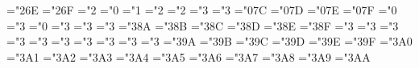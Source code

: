 { \def\bmlgroup{\delimiter"4\mtbmi@@2E\mtbex@@3A }%
 \def\bmrgroup{\delimiter"5\mtbmi@@2F\mtbex@@3B }%
 \def\bmbracevert{\delimiter"\mtbex@@8D\mtbex@@8D }%
 \mathchardef\bmsetminus="2\mtbsy@@6E 
 \mathchardef\bmwr="2\mtbsy@@6F
 \def\bmsurd{{\mathchar"1\mtbsy@@70}}%
 \mathchardef\bmamalg="2
 \mathchardef\bmnabla="0
 \mathchardef\bmsmallint="1
 \mathchardef\bmsqcup="2
 \mathchardef\bmsqcap="2
 \mathchardef\bmsqsubseteq="3
 \mathchardef\bmsqsupseteq="3
 \mathchardef\bmclubsuit="0\mtbsy@@7C
 \mathchardef\bmdiamondsuit="0\mtbsy@@7D
 \mathchardef\bmheartsuit="0\mtbsy@@7E
 \mathchardef\bmspadesuit="0\mtbsy@@7F
 \mathchardef\bmhbar="0
 \mathchardef\bmnotin="3
 \mathchardef\bmangle="0
 \mathchardef\bmdoteq="3
 \mathchardef\bmmodels="3
 \mathchardef\bmbowtie="3
 \mathchardef\bmcong="3\mtbsy@@8A
 \mathchardef\bmhookleftarrow="3\mtbsy@@8B
 \mathchardef\bmhookrightarrow="3\mtbsy@@8C
 \mathchardef\bmlongleftarrow="3\mtbsy@@8D
 \mathchardef\bmlongrightarrow="3\mtbsy@@8E
 \mathchardef\bmLongleftarrow="3\mtbsy@@8F
 \mathchardef\bmLongrightarrow="3
 \mathchardef\bmmapsto="3
 \mathchardef\bmlongmapsto="3
 \mathchardef\bmlongleftrightarrow="3
 \mathchardef\bmLongleftrightarrow="3
 \def\bmiff{\;\bmLongleftrightarrow\;}%
 \mathchardef\bmrightleftharpoons="3
 \mathchardef\bmnotless="3
 \mathchardef\bmnotleq="3
 \mathchardef\bmnotprec="3
 \mathchardef\bmnotpreceq="3
 \mathchardef\bmnotsubset="3\mtbsy@@9A
 \mathchardef\bmnotsubseteq="3\mtbsy@@9B
 \mathchardef\bmnotsqsubseteq="3\mtbsy@@9C
 \mathchardef\bmnotgr="3\mtbsy@@9D
 \mathchardef\bmnotgeq="3\mtbsy@@9E
 \mathchardef\bmnotsucc="3\mtbsy@@9F
 \mathchardef\bmnotsucceq="3\mtbsy@@ A0
 \mathchardef\bmnotsupset="3\mtbsy@@ A1
 \mathchardef\bmnotsupseteq="3\mtbsy@@ A2
 \mathchardef\bmnotsqsupseteq="3\mtbsy@@ A3
 \mathchardef\bmneq="3\mtbsy@@ A4 \let\bmne=\bmneq
 \mathchardef\bmnotequiv="3\mtbsy@@ A5
 \mathchardef\bmnotsim="3\mtbsy@@ A6
 \mathchardef\bmnotsimeq="3\mtbsy@@ A7
 \mathchardef\bmnotapprox="3\mtbsy@@ A8
 \mathchardef\bmnotcong="3\mtbsy@@ A9
 \mathchardef\bmnotasymp="3\mtbsy@@ AA
 \def\bmgrave{\ifnum\fam=\m@ne\mathaccent"0\mtbsy@@4A \else\@grave@\fi}%
 \def\bmacute{\ifnum\fam=\m@ne\mathaccent"0\mtbsy@@4B \else\@acute@\fi}%
 \def\bmcheck{\ifnum\fam=\m@ne\mathaccent"0\mtbsy@@4C \else\@check@\fi}%
 \def\bmbreve{\ifnum\fam=\m@ne\mathaccent"0\mtbsy@@4D \else\@breve@\fi}%
 \def\bmbar{\ifnum\fam=\m@ne\mathaccent"0\mtbsy@@4E \else\@bar@\fi}%
}
